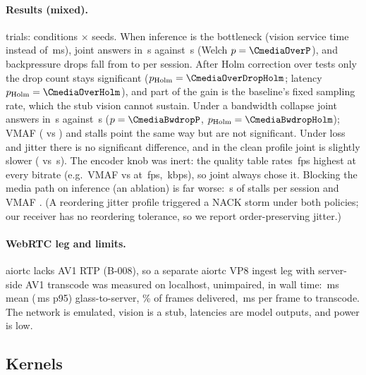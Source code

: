 \paragraph{Results (mixed).} \CmediaTrials{} trials: \CmediaConditions{} conditions $\times$
\CmediaSeeds{} seeds. When inference is the bottleneck (vision service time  instead of
\,ms), joint answers in \CmediaOverloadGaJoint\,s against \CmediaOverloadGaIndep\,s (Welch
$p=\CmediaOverP$), and backpressure drops fall from \CmediaOverDropIndep{} to \CmediaOverDropJoint{} per
session. After Holm correction over \CmediaTests{} tests only the drop count stays significant
($p_\text{Holm}=\CmediaOverDropHolm$; latency $p_\text{Holm}=\CmediaOverHolm$), and part of the gain is the
baseline's fixed sampling rate, which the stub vision cannot sustain. Under a bandwidth collapse joint
answers in \CmediaBwdropGaJoint\,s against \CmediaBwdropGaIndep\,s ($p=\CmediaBwdropP$,
$p_\text{Holm}=\CmediaBwdropHolm$); VMAF (\CmediaBwdropVmafJoint{} vs \CmediaBwdropVmafIndep) and stalls
point the same way but are not significant. Under loss and jitter there is no significant difference, and
in the clean profile joint is slightly slower (\CmediaCleanGaJoint{} vs \CmediaCleanGaIndep\,s). The
encoder knob was inert: the quality table rates \,fps highest at every bitrate (e.g.\ VMAF
\CmediaCalFourThirty{} vs \CmediaCalFourTen{} at \,fps, \,kbps), so joint always chose it.
Blocking the media path on inference (an ablation) is far worse: \CmediaOverloadStallBlock\,s of stalls
per session and VMAF \CmediaOverloadVmafBlock. (A reordering jitter profile triggered a NACK storm under both
policies; our receiver has no reordering tolerance, so we report order-preserving jitter.)

\paragraph{WebRTC leg and limits.} aiortc lacks AV1 RTP (B-008), so a separate aiortc VP8 ingest leg with
server-side AV1 transcode was measured on localhost, unimpaired, in wall time: \CrtcGsMean\,ms mean
(\CrtcGsP\,ms p95) glass-to-server, \CrtcDelivery\% of frames delivered, \CrtcTranscode\,ms per frame to
transcode. The network is emulated, vision is a stub, latencies are model outputs, and power is low.

\subsection{Kernels}
\label{sec:ext-kern}

